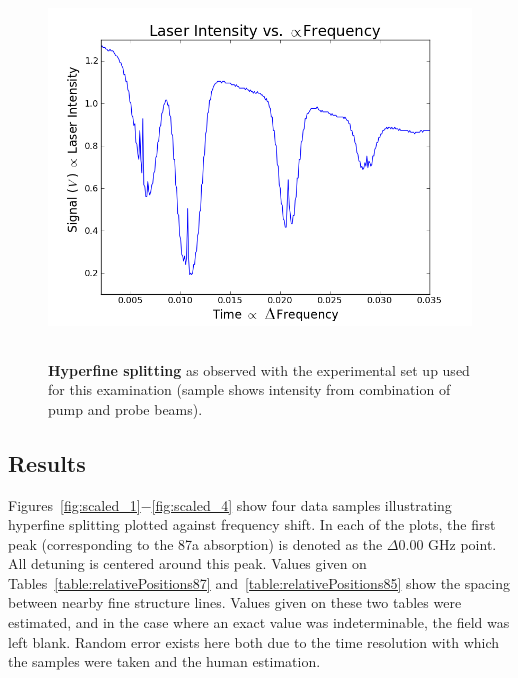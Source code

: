\documentclass[paper=a4, fontsize=11pt]{scrartcl} %
\numberwithin{equation}{section}
\numberwithin{figure}{section}
\numberwithin{table}{section}
\begin{document}
\begin{figure}[h] \begin{center}
  \includegraphics[height=100mm]{3-1-001.png}
  \caption{\textbf{Hyperfine splitting} as observed with the experimental set up used for this examination (sample shows intensity from combination of pump and probe beams). }
  \label{fig:satabsorb1}
\end{center} \end{figure}


\subsection{Results}


Figures~\ref{fig:scaled_1}$-$\ref{fig:scaled_4} show four data samples
illustrating hyperfine splitting plotted against frequency shift. In
each of the plots, the first peak (corresponding to the 87a
absorption) is denoted as the $\Delta 0.00$ GHz point. All detuning is
centered around this peak. Values given on
Tables~\ref{table:relativePositions87}
and~\ref{table:relativePositions85} show the spacing between nearby
fine structure lines. Values given on these two tables were estimated, and in the case where an exact value was indeterminable, the field was left blank. Random error exists here both due to the time resolution with which the samples were taken and the human estimation.
\end{document}
